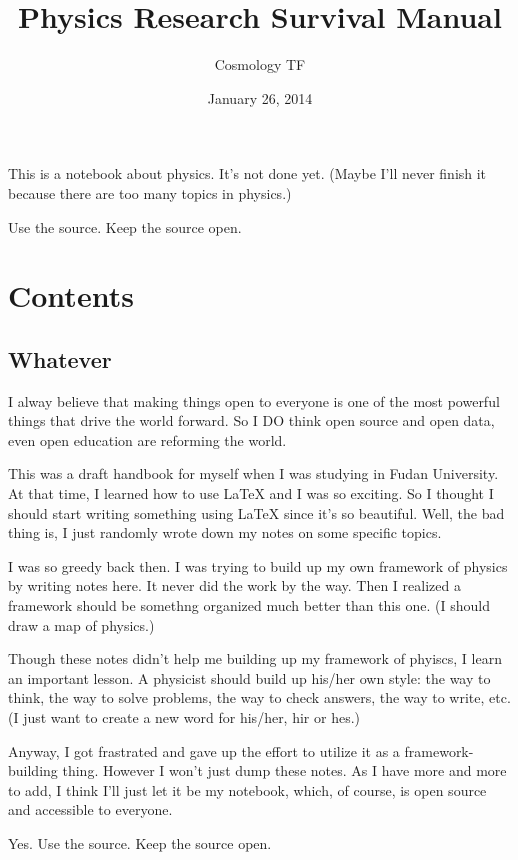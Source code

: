 \documentclass[letterpaper,10pt,english]{sphinxmanual}
\title{Physics Research Survival Manual}
\date{January 26, 2014}
\author{Cosmology TF}
\begin{document}
\maketitle
\tableofcontents
{}\label{index::doc}


This is a notebook about physics. It's not done yet. (Maybe I'll never finish it because there are too many topics in physics.)

Use the source. Keep the source open.


\chapter{Contents}
\label{index:welcome-to-physics-research-survival-manual}\label{index:contents}

\section{Whatever}
\label{preface::doc}\label{preface:whatever}
I alway believe that making things open to everyone is one of the most powerful things that drive the world forward. So I DO think open source and open data, even open education are reforming the world.

This was a draft handbook for myself when I was studying in Fudan University. At that time, I learned how to use LaTeX and I was so exciting. So I thought I should start writing something using LaTeX since it's so beautiful. Well, the bad thing is, I just randomly wrote down my notes on some specific topics.

I was so greedy back then. I was trying to build up my own framework of physics by writing notes here. It never did the work by the way. Then I realized a framework should be somethng organized much better than this one. (I should draw a map of physics.)

Though these notes didn't help me building up my framework of phyiscs, I learn an important lesson. A physicist should build up his/her own style: the way to think, the way to solve problems, the way to check answers, the way to write, etc.  (I just want to create a new word for his/her, hir or hes.)

Anyway, I got frastrated and gave up the effort to utilize it as a framework-building thing. However I won't just dump these notes. As I have more and more to add, I think I'll just let it be my notebook, which, of course, is open source and accessible to everyone.

Yes. Use the source. Keep the source open.
\end{document}
